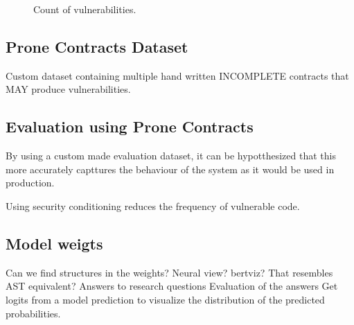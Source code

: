 \begin{figure}[htp]
    \centering
    
    \caption{Count of vulnerabilities.}
    \label{fig:vulnerability-count}
\end{figure}

\subsection{Prone Contracts Dataset}
\label{sec:inclined-vulnerabilities}
Custom dataset containing multiple hand written INCOMPLETE contracts that MAY produce vulnerabilities.

\subsection{Evaluation using Prone Contracts}
\label{sec:eval-prone-contracts}
By using a custom made evaluation dataset, it can be hypotthesized that this more accurately capttures the behaviour of the system as it would be used in production.

Using security conditioning reduces the frequency of vulnerable code.


\subsection{Model weigts}
Can we find structures in the weights? Neural  view? bertviz? That resembles AST equivalent?
Answers to research questions
Evaluation of the answers
Get logits from a model  prediction to visualize the distribution of the predicted probabilities.
